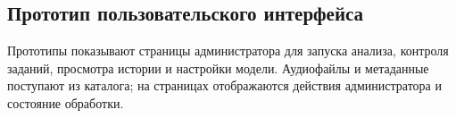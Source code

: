 \subsection{Прототип пользовательского интерфейса}

Прототипы показывают страницы администратора для запуска анализа, контроля
заданий, просмотра истории и настройки модели. Аудиофайлы и метаданные
поступают из каталога; на страницах отображаются действия администратора
и состояние обработки.


